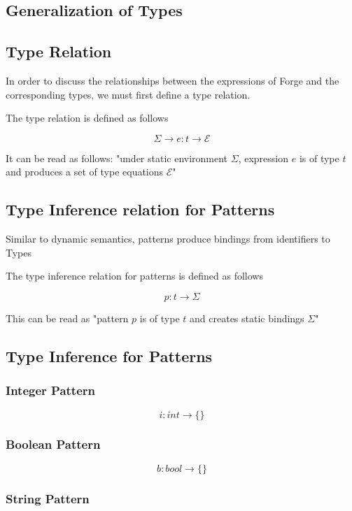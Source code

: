 \documentclass[titlepage]{article}
\begin{document}
\subsection{Generalization of Types}



\subsection{Type Relation}

In order to discuss the relationships between the expressions of Forge and the corresponding types, we must first define a type relation.

The type relation is defined as follows

$$\Sigma \rightarrow e : t \rightarrow \mathcal{E}$$

It can be read as follows: "under static environment $\Sigma$, expression $e$ is of type $t$ and produces a set of type equations $\mathcal{E}$"

\subsection{Type Inference relation for Patterns}

Similar to dynamic semantics, patterns produce bindings from identifiers to Types

The type inference relation for patterns is defined as follows

$$p : t \rightarrow \Sigma$$

This can be read as "pattern $p$ is of type $t$ and creates static bindings $\Sigma$"

\subsection{Type Inference for Patterns}

\subsubsection{Integer Pattern}

$$i : int \rightarrow \{\}$$

\subsubsection{Boolean Pattern}

$$b : bool \rightarrow \{\}$$

\subsubsection{String Pattern}
\end{document}
